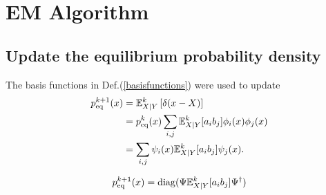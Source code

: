 \chapter{EM Algorithm}
\section{Update the equilibrium probability density}
\begin{definition}
    The basis functions in Def.(\ref{basisfunctions}) were used to update
\begin{align}
    p_{\rm eq}^{k+1}(x) &=\mathbb{E}^k_{X|Y} \left[ \delta(x-X) \right] \\
    &= p^k_{\rm{eq}}(x) \sum_{i,j} \mathbb{E}^k_{X|Y}[a_ib_j] \phi_i(x)\phi_j(x) \\
    &= \sum_{i,j} \psi_i(x) \mathbb{E}^k_{X|Y}[a_ib_j] \psi_j(x).
\end{align}
\end{definition}

\begin{definition}
\begin{align}
    p_{\rm eq}^{k+1}(x) = \mathrm{diag}(\Psi \mathbb{E}^k_{X|Y}[a_ib_j] \Psi^{\dagger})
\end{align}
\end{definition}

